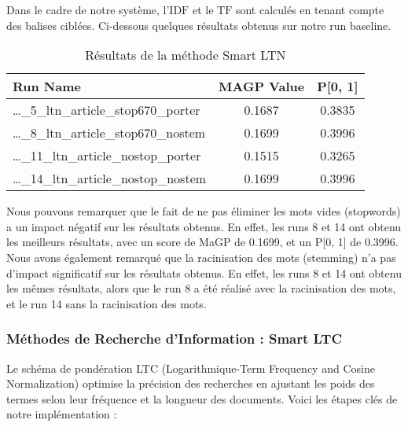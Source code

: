 \documentclass[a4paper, 12pt]{article}
\begin{document}
Dans le cadre de notre système, l'$\text{IDF}$ et le $\text{TF}$ sont calculés en tenant compte des balises ciblées.
Ci-dessous quelques résultats obtenus sur notre run baseline.
\begin{table}[h]
    \centering
    \begin{tabular}{l c c}
        \toprule
        \textbf{Run Name} & \textbf{MAGP Value} & \textbf{P[0, 1]} \\
        \midrule
        \dots\_5\_ltn\_article\_stop670\_porter & 0.1687 & 0.3835 \\
        \dots\_8\_ltn\_article\_stop670\_nostem & 0.1699 & 0.3996 \\
        \dots\_11\_ltn\_article\_nostop\_porter & 0.1515 & 0.3265 \\
        \dots\_14\_ltn\_article\_nostop\_nostem & 0.1699 & 0.3996 \\
        \bottomrule
    \end{tabular}
    \caption{Résultats de la méthode Smart LTN}
    \label{tab:result_ltn}
\end{table}

Nous pouvons remarquer que le fait de ne pas éliminer les mots vides (stopwords) 
a un impact négatif sur les résultats obtenus. En effet, les runs 8 et 14 ont obtenu les meilleurs résultats,
avec un score de MaGP de 0.1699, et un P[0, 1] de 0.3996. Nous avons également remarqué que la racinisation des mots (stemming)
n'a pas d'impact significatif sur les résultats obtenus. En effet, les runs 8 et 14 ont obtenu les mêmes résultats,
alors que le run 8 a été réalisé avec la racinisation des mots, et le run 14 sans la racinisation des mots.


\subsubsection{Méthodes de Recherche d'Information : Smart LTC}
Le schéma de pondération LTC (Logarithmique-Term Frequency and Cosine Normalization) optimise la précision des recherches en ajustant les poids des termes selon leur fréquence et la longueur des documents. Voici les étapes clés de notre implémentation :
\end{document}
